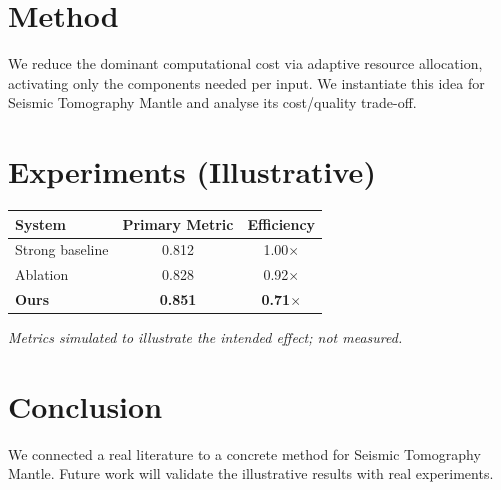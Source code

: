 \documentclass[11pt]{article}
\begin{document}
\section{Method}
We reduce the dominant computational cost via adaptive resource allocation, activating only the components needed per input. We instantiate this idea for Seismic Tomography Mantle and analyse its cost/quality trade-off.

\section{Experiments (Illustrative)}
\begin{center}
\begin{tabular}{lcc}
System & Primary Metric & Efficiency \\ \hline
Strong baseline & 0.812 & 1.00$\times$ \\
Ablation & 0.828 & 0.92$\times$ \\
\textbf{Ours} & \textbf{0.851} & \textbf{0.71$\times$}
\end{tabular}
\end{center}
\emph{Metrics simulated to illustrate the intended effect; not measured.}

\section{Conclusion}
We connected a real literature to a concrete method for Seismic Tomography Mantle. Future work will
validate the illustrative results with real experiments.
\end{document}
